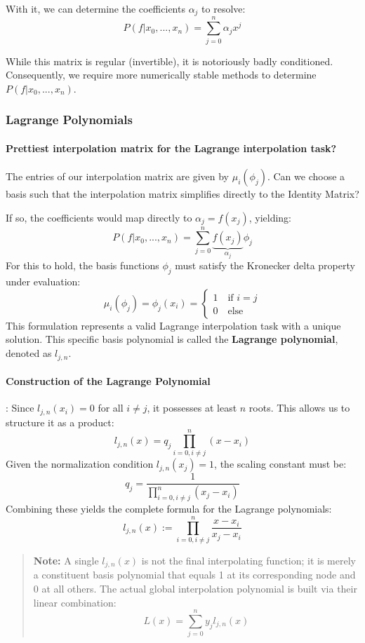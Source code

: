 \documentclass{article}
\begin{document}
With it, we can determine the coefficients $\alpha_j$ to resolve:
\[P(f|x_0,...,x_n) = \sum_{j=0}^n\alpha_jx^j\]

While this matrix is regular (invertible), it is notoriously badly conditioned. Consequently, we require more numerically stable methods to determine $P(f|x_0,...,x_n)$.

\subsubsection{Lagrange Polynomials}

\paragraph{Prettiest interpolation matrix for the Lagrange interpolation task?}
The entries of our interpolation matrix are given by $\mu_i(\phi_j)$. Can we choose a basis such that the interpolation matrix simplifies directly to the Identity Matrix?

If so, the coefficients would map directly to $\alpha_j = f(x_j)$, yielding:
\[P(f|x_0,...,x_n) = \sum_{j=0}^n\underbrace{f(x_j)}_{\alpha_j}\phi_j\]
For this to hold, the basis functions $\phi_j$ must satisfy the Kronecker delta property under evaluation:
\[\mu_i(\phi_j) = \phi_j(x_i) = \begin{cases}
  1 \quad \text{if } i = j\\
  0 \quad \text{else}
\end{cases}\]
This formulation represents a valid Lagrange interpolation task with a unique solution. This specific basis polynomial is called the \textbf{Lagrange polynomial}, denoted as $l_{j,n}$.

\paragraph{Construction of the Lagrange Polynomial}: 
Since $l_{j,n}(x_i) = 0$ for all $i \neq j$, it possesses at least $n$ roots. This allows us to structure it as a product:
\[l_{j,n}(x) = q_j \prod_{i=0,i\neq j}^n(x-x_i)\]
Given the normalization condition $l_{j,n}(x_j) = 1$, the scaling constant must be:
\[q_j = \frac{1}{\prod_{i=0,i\neq j}^n (x_j - x_i)}\]
Combining these yields the complete formula for the Lagrange polynomials:
\[l_{j,n}(x) := \prod_{i=0,i\neq j}^n\frac{x-x_i}{x_j-x_i}\]

\begin{quote}
\textbf{Note:} A single $l_{j,n}(x)$ is not the final interpolating function; it is merely a constituent basis polynomial that equals 1 at its corresponding node and 0 at all others. The actual global interpolation polynomial is built via their linear combination:
\[L(x) = \sum_{j=0}^{n}y_jl_{j,n}(x)\]
\end{quote}
\end{document}
